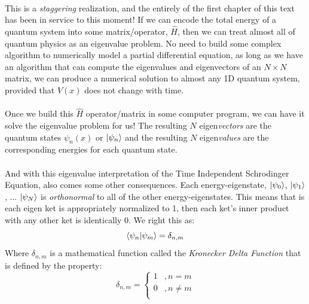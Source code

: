 \documentclass[12pt,letterpaper]{book}
\begin{document}
\paragraph*{}This is a \textit{staggering} realization, and the entirely of the first chapter of this text has been in service to this moment! If we can encode the total energy of a quantum system into some matrix/operator, $\hat{H}$, then we can treat almost all of quantum physics as an eigenvalue problem. No need to build some complex algorithm to numerically model a partial differential equation, as long as we have an algorithm that can compute the eigenvalues and eigenvectors of an $N \times N$ matrix, we can produce a numerical solution to almost any 1D quantum system, provided that $V(x)$ does not change with time.
\paragraph*{}Once we build this $\hat{H}$ operator/matrix in some computer program, we can have it solve the eigenvalue problem for us! The resulting $N$ eigen\textit{vectors} are the quantum states $\psi_n(x)$ or $\ket{\psi_n}$ and the resulting $N$ eigen\textit{values} are the corresponding energies for each quantum state.
\paragraph*{}And with this eigenvalue interpretation of the Time Independent Schrodinger Equation, also comes some other consequences. Each energy-eigenstate, $\ket{\psi_0}$, $\ket{\psi_1}$, ...  $\ket{\psi_N}$ is \textit{orthonormal} to all of the other energy-eigenstates. This means that is each eigen ket is appropriately normalized to 1, then each ket's inner product with any other ket is identically 0. We right this as:
\begin{equation}
\label{orthonorm}
\braket{\psi_n}{\psi_m} = \delta_{n,m}
\end{equation}
Where $\delta_{n,m}$ is a mathematical function called the \textit{Kronecker Delta Function} that is defined by the property:
\begin{equation}
\label{kronecker}
\delta_{n,m} = 
	\left\{
        \begin{array}{ll}
            1 	&, n = m \\
            0 	&, n \neq m \\
        \end{array}
    \right.
\end{equation}
\end{document}
